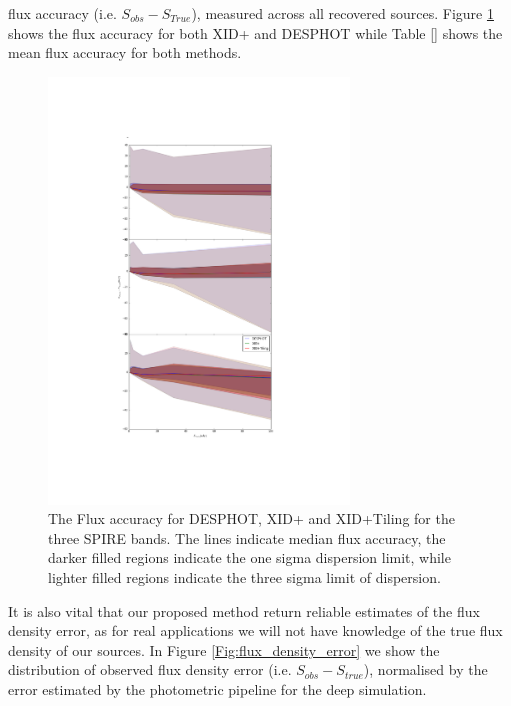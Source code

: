 \documentclass[useAMS,usenatbib]{mn2e}
\begin{document}
flux accuracy (i.e. $S_{obs} - S_{True}$), measured across all recovered sources. Figure \ref{Fig:flux_acc} shows the flux accuracy for both XID+ and DESPHOT while Table \ref{} shows the mean flux accuracy for both methods.

\begin{figure}
\includegraphics[width=8cm]{./Figures/Flux_accuracy}
\caption{The Flux accuracy for DESPHOT, XID+ and XID+Tiling for the three SPIRE bands. The lines indicate median flux accuracy, the darker filled regions indicate the one sigma dispersion limit, while lighter filled regions indicate the three sigma limit of dispersion.}\label{Fig:flux_acc}
\end{figure}

It is also vital that our proposed method return reliable estimates of the flux density error, as for real applications we will not have knowledge of the true flux density of our sources. In Figure \ref{Fig:flux_density_error} we show the distribution of observed flux density error (i.e. $S_{obs}-S_{true}$), normalised by the error estimated by the photometric pipeline for the deep simulation. 
\end{document}
